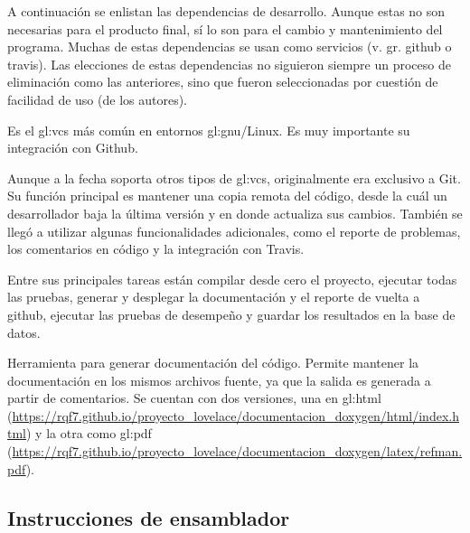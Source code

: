 A continuación se enlistan las dependencias de desarrollo.
Aunque estas no son necesarias para el producto final, sí lo son para
el cambio y mantenimiento del programa. Muchas de estas dependencias
se usan como servicios (v. gr. github o travis). Las elecciones
de estas dependencias no siguieron siempre un proceso de eliminación como las
anteriores, sino que fueron seleccionadas por cuestión de facilidad
de uso (de los autores).

{%
  Es el \gls{gl:vcs} más común en entornos \acrshort{gl:gnu}/Linux.
  Es muy importante su integración con Github.
}

{%
  Aunque a la fecha soporta otros tipos de \gls{gl:vcs}, originalmente
  era exclusivo a Git. Su función principal es mantener una copia
  remota del código, desde la cuál un desarrollador baja la última versión
  y en donde actualiza sus cambios. También se llegó a utilizar algunas
  funcionalidades adicionales, como el reporte de problemas, los comentarios
  en código y la integración con Travis.
}

{%
  Entre sus principales tareas están compilar desde cero el proyecto, ejecutar
  todas las pruebas, generar y desplegar la documentación y el reporte de
  vuelta a github, ejecutar las pruebas de desempeño y guardar los resultados
  en la base de datos.
}

{%
  Herramienta para generar documentación del código. Permite mantener la
  documentación en los mismos archivos fuente, ya que la salida es generada
  a partir de comentarios. Se cuentan con dos versiones, una en
  \acrshort{gl:html} (\url{https://rqf7.github.io/proyecto_lovelace/documentacion_doxygen/html/index.html})
  y la otra como \acrshort{gl:pdf} (\url{https://rqf7.github.io/proyecto_lovelace/documentacion_doxygen/latex/refman.pdf}).
}

\subsection{Instrucciones de ensamblador}
\label{sec:intel}

